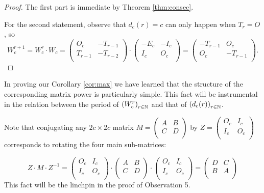 \begin{proof}
The first part is immediate by Theorem \ref{thm:consec}.

For the second statement, observe that $d_c(r)=c$ can only happen
when $T_r=O$, so
\[W_{c}^{r+1} = W_{c}^{r}\cdot W_{c}=
\left(\begin{matrix} O_c & -T_{r-1} \\ T_{r-1} & -T_{r-2} \\\end{matrix}\right)\cdot
\left(\begin{matrix} -E_{c} & -I_c \\ I_{c} & O_c \\\end{matrix}\right)=
\left(\begin{matrix} -T_{r-1} & O_c \\ O_c & -T_{r-1} \\\end{matrix}
\right).
\]
\end{proof}

In proving our Corollary \ref{cor:max} we have learned that the
structure of the corresponding matrix power is particularly simple. 
This fact will
be instrumental in the relation between the period of
$\left(W_{c}^{r}\right)_{r\in\mathbb{N}}$ and that of
$\left(d_{c}(r)\right)_{r\in\mathbb{N}}$.

Note that conjugating any $2c\times 2c$ matrix $M=
\left(\begin{smallmatrix} A & B \\ C & D \\\end{smallmatrix}\right)$ by
$Z=\left(\begin{smallmatrix} O_c & I_c \\ I_c & O_c \\\end{smallmatrix}\right)$ 
corresponds to rotating the four main sub-matrices:

\[
Z\cdot M\cdot Z^{-1}=\left(\begin{matrix} O_c & I_c \\ I_c & O_c \\\end{matrix}\right)
\cdot
\left(\begin{matrix} A & B \\ C & D \\\end{matrix}\right)
\cdot
\left(\begin{matrix} O_c & I_c \\ I_c & O_c \\\end{matrix}\right)
=
\left(\begin{matrix} D & C \\ B & A \\\end{matrix}\right)
\]
This fact will be the linchpin in the proof of Observation 5.

